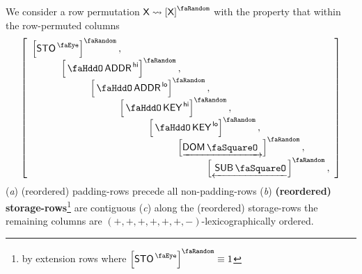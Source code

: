 We consider a row permutation $\col{X}\rightsquigarrow\order{\col{X}}$ with the property that within the row-permuted columns
\[
	\left[ \begin{array}{l}
		\order{\peekStorage}, \\
		\quad\quad\quad \order{\stoAddressHi}, \\
		\quad\quad\quad \quad\quad\quad \order{\stoAddressLo}, \\
		\quad\quad\quad \quad\quad\quad \quad\quad\quad \order{\stoKeyHi}, \\
		\quad\quad\quad \quad\quad\quad \quad\quad\quad \quad\quad\quad \order{\stoKeyLo}, \\
		\quad\quad\quad \quad\quad\quad \quad\quad\quad \quad\quad\quad \quad\quad\quad \order{\domStamp}, \\
		\quad\quad\quad \quad\quad\quad \quad\quad\quad \quad\quad\quad \quad\quad\quad \quad\quad\quad \order{\subStamp}, \\
	\end{array} \right]
\]
\noindent
(\emph{a}) (reordered) padding-rows precede all non-padding-rows
(\emph{b}) \textbf{(reordered) storage-rows}\footnote{by extension rows where $\order{\peekStorage} \equiv 1$} are contiguous
(\emph{c}) along the (reordered) storage-rows the remaining columns are $(+, +, +, +, +, +, -)$-lexicographically ordered.
